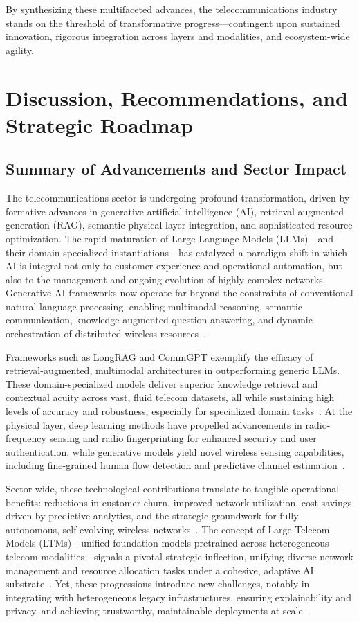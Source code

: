 \documentclass[sigconf]{acmart}
\begin{document}
\vspace{2em}
\noindent
By synthesizing these multifaceted advances, the telecommunications industry stands on the threshold of transformative progress—contingent upon sustained innovation, rigorous integration across layers and modalities, and ecosystem-wide agility.

\section{Discussion, Recommendations, and Strategic Roadmap}

\subsection{Summary of Advancements and Sector Impact}

The telecommunications sector is undergoing profound transformation, driven by formative advances in generative artificial intelligence (AI), retrieval-augmented generation (RAG), semantic-physical layer integration, and sophisticated resource optimization. The rapid maturation of Large Language Models (LLMs)—and their domain-specialized instantiations—has catalyzed a paradigm shift in which AI is integral not only to customer experience and operational automation, but also to the management and ongoing evolution of highly complex networks. Generative AI frameworks now operate far beyond the constraints of conventional natural language processing, enabling multimodal reasoning, semantic communication, knowledge-augmented question answering, and dynamic orchestration of distributed wireless resources~\cite{ref7,ref16}. 

Frameworks such as LongRAG and CommGPT exemplify the efficacy of retrieval-augmented, multimodal architectures in outperforming generic LLMs. These domain-specialized models deliver superior knowledge retrieval and contextual acuity across vast, fluid telecom datasets, all while sustaining high levels of accuracy and robustness, especially for specialized domain tasks~\cite{ref7,ref16}. At the physical layer, deep learning methods have propelled advancements in radio-frequency sensing and radio fingerprinting for enhanced security and user authentication, while generative models yield novel wireless sensing capabilities, including fine-grained human flow detection and predictive channel estimation~\cite{ref18,ref19,ref21}.

Sector-wide, these technological contributions translate to tangible operational benefits: reductions in customer churn, improved network utilization, cost savings driven by predictive analytics, and the strategic groundwork for fully autonomous, self-evolving wireless networks~\cite{ref16,ref46}. The concept of Large Telecom Models (LTMs)—unified foundation models pretrained across heterogeneous telecom modalities—signals a pivotal strategic inflection, unifying diverse network management and resource allocation tasks under a cohesive, adaptive AI substrate~\cite{ref16}. Yet, these progressions introduce new challenges, notably in integrating with heterogeneous legacy infrastructures, ensuring explainability and privacy, and achieving trustworthy, maintainable deployments at scale~\cite{ref7,ref16,ref17,ref18,ref46}.
\end{document}
